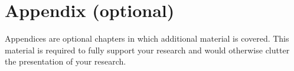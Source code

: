 \chapter{Appendix (optional)}\label{appendix}

Appendices are optional chapters in which additional material is covered. This material is required to fully support your research and would otherwise clutter the presentation of your research.


